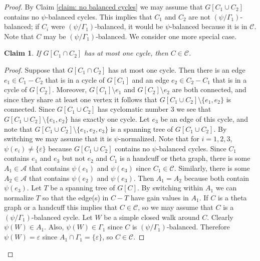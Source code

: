 \documentclass[12pt]{article}
\newtheorem{claim}{Claim}[theorem]
\theoremstyle{definition}
\newcommand{\cA}{\mathcal{A}}
\newcommand{\cC}{\mathcal{C}}
\newcommand{\ep}{\varepsilon}
\newcommand{\del}{\!\setminus\!}
\begin{document}
\begin{proof}
By Claim \ref{claim: no balanced cycles} we may assume that $G[C_1 \cup C_2]$ contains no $\psi$-balanced cycles. 
This implies that $C_1$ and $C_2$ are not $(\psi/\Gamma_1)$-balanced; if $C_i$ were $(\psi/\Gamma_1)$-balanced, it would be $\psi$-balanced because it is in $\cC$.
Note that $C$ may be $(\psi/\Gamma_1)$-balanced.
We consider one more special case.

\begin{claim} \label{claim: only one cycle}
If $G[C_1 \cap C_2]$ has at most one cycle, then $C \in \cC$.
\end{claim}
\begin{proof}
Suppose that $G[C_1 \cap C_2]$ has at most one cycle.
Then there is an edge $e_1 \in C_1 - C_2$ that is in a cycle of $G[C_1]$ and an edge $e_2 \in C_2 - C_1$ that is in a cycle of $G[C_2]$.
Moreover, $G[C_1] \del e_1$ and $G[C_2] \del e_2$ are both connected, and since they share at least one vertex it follows that $G[C_1 \cup C_2] \del \{e_1, e_2\}$ is connected.
Since $G[C_1 \cup C_2]$ has cyclomatic number $3$ we see that $G[C_1 \cup C_2] \del \{e_1, e_2\}$ has exactly one cycle.
Let $e_3$ be an edge of this cycle, and note that $G[C_1 \cup C_2] \del \{e_1, e_2, e_3\}$ is a spanning tree of $G[C_1 \cup C_2]$.
By switching we may assume that it is $\psi$-normalized.
Note that for $i = 1,2,3$, $\psi(e_i) \ne \{\ep\}$ because $G[C_1 \cup C_2]$ contains no $\psi$-balanced cycles.
Since $C_1$ contains $e_1$ and $e_3$ but not $e_2$ and $C_1$ is a handcuff or theta graph, there is some $A_1 \in \cA$ that contains $\psi(e_1)$ and $\psi(e_3)$ since $C_1 \in \cC$.
Similarly, there is some $A_2 \in \cA$ that contains $\psi(e_2)$ and $\psi(e_3)$.
Then $A_1 = A_2$ because both contain $\psi(e_3)$.
Let $T$ be a spanning tree of $G[C]$.
By switching within $A_1$ we can normalize $T$ so that the edge(s) in $C - T$ have gain values in $A_1$.
If $C$ is a theta graph or a handcuff this implies that $C \in \cC$, so we may assume that $C$ is a $(\psi/\Gamma_1)$-balanced cycle.
Let $W$ be a simple closed walk around $C$.
Clearly $\psi(W) \in A_1$.
Also, $\psi(W) \in \Gamma_1$ since $C$ is $(\psi/\Gamma_1)$-balanced.
Therefore $\psi(W) = \ep$ since $A_1 \cap \Gamma_1 = \{\ep\}$, so $C \in \cC$.
\end{proof}


\end{proof}
\end{document}
